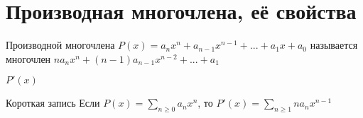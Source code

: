 \section{Производная многочлена, её свойства}

\begin{definition}
	Производной многочлена $P(x) = a_nx^n + a_{n - 1}x^{n - 1} + ... + a_1x + a_0 $ называется многочлен $na_nx^n + (n - 1)a_{n - 1}x^{n - 2} + ... + a_1 $
	\begin{notation}
		$P'(x)$
	\end{notation}

\end{definition}

\begin{undefthm}{Короткая запись}
	Если $P(x) = \sum_{n \ge 0} a_nx^n$, то $P'(x) = \sum_{n \ge 1}na_nx^{n - 1}$
\end{undefthm}

